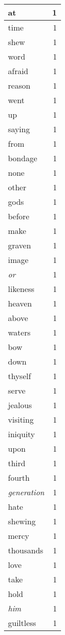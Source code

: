 \begin{center}
\begin{longtable}{l|r}
at & 1 \\ \hline
time & 1 \\ \hline
shew & 1 \\ \hline
word & 1 \\ \hline
afraid & 1 \\ \hline
reason & 1 \\ \hline
went & 1 \\ \hline
up & 1 \\ \hline
saying & 1 \\ \hline
from & 1 \\ \hline
bondage & 1 \\ \hline
none & 1 \\ \hline
other & 1 \\ \hline
gods & 1 \\ \hline
before & 1 \\ \hline
make & 1 \\ \hline
graven & 1 \\ \hline
image & 1 \\ \hline
\emph{or} & 1 \\ \hline
likeness & 1 \\ \hline
heaven & 1 \\ \hline
above & 1 \\ \hline
waters & 1 \\ \hline
bow & 1 \\ \hline
down & 1 \\ \hline
thyself & 1 \\ \hline
serve & 1 \\ \hline
jealous & 1 \\ \hline
visiting & 1 \\ \hline
iniquity & 1 \\ \hline
upon & 1 \\ \hline
third & 1 \\ \hline
fourth & 1 \\ \hline
\emph{generation} & 1 \\ \hline
hate & 1 \\ \hline
shewing & 1 \\ \hline
mercy & 1 \\ \hline
thousands & 1 \\ \hline
love & 1 \\ \hline
take & 1 \\ \hline
hold & 1 \\ \hline
\emph{him} & 1 \\ \hline
guiltless & 1 \\ \hline

\end{longtable}
\end{center}
